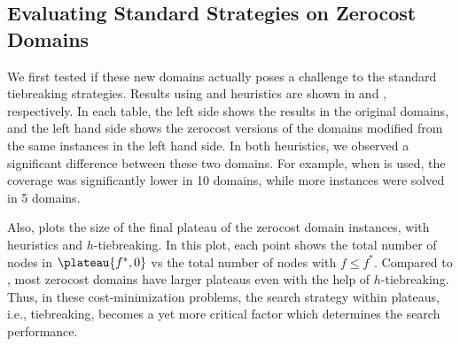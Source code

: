 \subsection{Evaluating Standard Strategies on Zerocost Domains}

We first tested if these new domains actually poses a challenge to the
standard tiebreaking strategies. Results using \lmcut and \mands
heuristics are shown in  and
, respectively. In each table, the left
side shows the results in the original domains, and the left hand side
shows the zerocost versions of the domains modified from the same
instances in the left hand side. In both heuristics, we observed a
significant difference between these two domains.  For example, when
\lmcut is used, the coverage was significantly lower in 10 domains,
while more instances were solved in 5 domains.

Also,  plots the size of the final plateau of the
zerocost domain instances, with \lmcut heuristics and $h$-tiebreaking. In this plot,
each point shows the total number of nodes in $\plateau{f^*,0}$ vs the
total number of nodes with $f\leq f^*$. Compared to ,
most zerocost domains have larger plateaus even with the help of
$h$-tiebreaking.  Thus, in these cost-minimization problems, the search
strategy within plateaus, i.e., tiebreaking, becomes a yet more critical
factor which determines the search performance.

